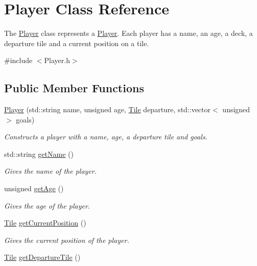 \hypertarget{classPlayer}{}\section{Player Class Reference}
\label{classPlayer}


The \mbox{\hyperlink{classPlayer}{Player}} class represents a \mbox{\hyperlink{classPlayer}{Player}}. Each player has a name, an age, a deck, a departure tile and a current position on a tile.  




{\ttfamily \#include $<$Player.\+h$>$}

\subsection*{Public Member Functions}
\begin{DoxyCompactItemize}
\item 
\mbox{\hyperlink{classPlayer_abf29edb717ec5ec6a50ac04aae5906da}{Player}} (std\+::string name, unsigned age, \mbox{\hyperlink{classTile}{Tile}} departure, std\+::vector$<$ unsigned $>$ goals)
\begin{DoxyCompactList}\small\item\em Constructs a player with a name, age, a departure tile and goals. \end{DoxyCompactList}\item 
std\+::string \mbox{\hyperlink{classPlayer_af1aa472885d589516f483e26e786600e}{get\+Name}} ()
\begin{DoxyCompactList}\small\item\em Gives the name of the player. \end{DoxyCompactList}\item 
unsigned \mbox{\hyperlink{classPlayer_aec713a46af4b798cc03d8f62309b9e52}{get\+Age}} ()
\begin{DoxyCompactList}\small\item\em Gives the age of the player. \end{DoxyCompactList}\item 
\mbox{\hyperlink{classTile}{Tile}} \mbox{\hyperlink{classPlayer_a164e97d2f255d0a6c55b9b355e079999}{get\+Current\+Position}} ()
\begin{DoxyCompactList}\small\item\em Gives the current position of the player. \end{DoxyCompactList}\item 
\mbox{\hyperlink{classTile}{Tile}} \mbox{\hyperlink{classPlayer_a9d585bfefe990358cf55448406cc047b}{get\+Departure\+Tile}} ()

\end{DoxyCompactItemize}
